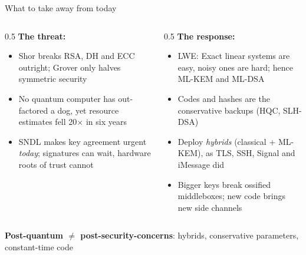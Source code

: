 \ifdefined\PRESENTATION\else\PassOptionsToClass{handout}{beamer}\fi\documentclass[aspectratio=169, lualatex]{beamer}
\begin{document}
\begin{frame}{What to take away from today}
	\vspace{-2mm}
	\begin{columns}[c]
		\begin{column}{0.5\textwidth}
			\textbf{The threat:}
			\begin{itemize}
				\item Shor breaks RSA, DH and ECC outright; Grover only halves symmetric security
				\item No quantum computer has out-factored a dog, yet resource estimates fell 20$\times$ in six years
				\item SNDL makes key agreement urgent \textit{today}; signatures can wait, hardware roots of trust cannot
			\end{itemize}
		\end{column}
		\begin{column}{0.5\textwidth}
			\textbf{The response:}
			\begin{itemize}
				\item LWE: Exact linear systems are easy, noisy ones are hard; hence ML-KEM and ML-DSA
				\item Codes and hashes are the conservative backups (HQC, SLH-DSA)
				\item Deploy \textit{hybrids} (classical + ML-KEM), as TLS, SSH, Signal and iMessage did
				\item Bigger keys break ossified middleboxes; new code brings new side channels
			\end{itemize}
		\end{column}
	\end{columns}
	\begin{center}
		\textbf{Post-quantum $\neq$ post-security-concerns}: hybrids, conservative parameters, constant-time code
	\end{center}
\end{frame}

\begin{frame}[plain]
	\titlepage
\end{frame}
\end{document}
